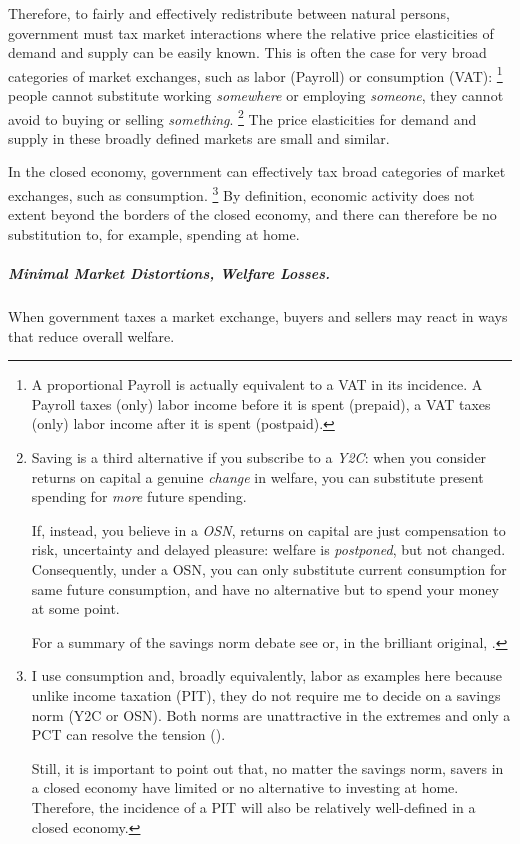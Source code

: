 Therefore, to fairly and effectively redistribute between natural persons, government must tax market interactions where the relative price elasticities of demand and supply can be easily known.
This is often the case for very broad categories of market exchanges, such as labor (\gls{Payroll}) or consumption (\gls{VAT}):
\footnote{
	A proportional \gls{Payroll} is actually equivalent to a \gls{VAT} in its incidence.
	A \gls{Payroll} taxes (only) labor income before it is spent (prepaid), a \gls{VAT} taxes (only) labor income after it is spent (postpaid).
}
people cannot substitute working \emph{somewhere} or employing \emph{someone}, they cannot avoid to buying or selling \emph{something}.
\footnote{
	Saving is a third alternative if you subscribe to a \emph{\gls{Y2C}}:
	when you consider returns on capital a genuine \emph{change} in welfare, you can substitute present spending for \emph{more} future spending.

	If, instead, you believe in a \emph{\gls{OSN}}, returns on capital are just compensation to risk, uncertainty and delayed pleasure:
	welfare is \emph{postponed}, but not changed.
	Consequently, under a \gls{OSN}, you can only substitute current consumption for same future consumption, and have no alternative but to spend your money at some point.

	For a summary of the savings norm debate see \cite{Held2010a} or, in the brilliant original, \cite[819]{McCaffery2005}.
}
The price elasticities for demand and supply in these broadly defined markets are small and similar.

In the closed economy, government can effectively tax broad categories of market exchanges, such as consumption.
\footnote{
	I use consumption and, broadly equivalently, labor as examples here because unlike income taxation (\gls{PIT}), they do not require me to decide on a savings norm (\gls{Y2C} or \gls{OSN}).
	Both norms are unattractive in the extremes and only a \gls{PCT} can resolve the tension (\citealt{Held2010a}).

	Still, it is important to point out that, no matter the savings norm, savers in a closed economy have limited or no alternative to investing at home.
	Therefore, the incidence of a \gls{PIT} will also be relatively well-defined in a closed economy.
}
By definition, economic activity does not extent beyond the borders of the closed economy, and there can therefore be no substitution to, for example, spending at home.

\subparagraph[Tax Efficiency]{Minimal Market Distortions, Welfare Losses.}
	\label{sec:minimal-DWL}
When government taxes a market exchange, buyers and sellers may react in ways that reduce overall welfare.

